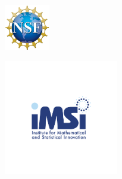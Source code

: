 \vspace{-4ex}
\begin{center}

	    \begin{minipage}{0.2\textwidth}
		\centering
		\includegraphics[height=2cm]{Photos/nsf_logo.png}
	\end{minipage}
	\hspace{2em}
	\begin{minipage}{0.2\textwidth}
		\centering
		\includegraphics[height=5cm]{Photos/imsi_logo.png}
	\end{minipage} \\[1em]
	

\end{center}
